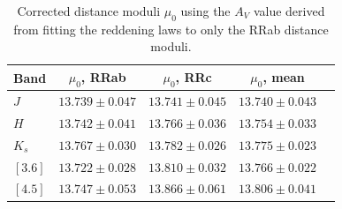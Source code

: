 \documentclass[a4paper,fleqn,usenatbib]{mnras}
\begin{document}

\endgroup

\begin{table}
\centering
\caption{Corrected distance moduli $\mu_0$ using the $A_V$ value derived from fitting the reddening laws to only the RRab distance moduli.}
\label{tab:dist_mod_ab}
\begin{tabular}{l||c|c|c|r} 
\hline \hline
Band & $\mu_0$, RRab & $\mu_0$, RRc & $\mu_0$, mean \\
\hline
$J$ & $13.739 \pm 0.047$ & $13.741 \pm 0.045$ & $13.740 \pm 0.043$ \\
$H$ & $13.742 \pm 0.041$ & $13.766 \pm 0.036$ & $13.754 \pm 0.033$ \\
$K_s$ & $13.767 \pm 0.030$ & $13.782 \pm 0.026$ & $13.775 \pm 0.023$ \\
$[3.6]$ & $13.722 \pm 0.028$ & $13.810 \pm 0.032$ & $13.766 \pm 0.022$ \\
$[4.5]$ & $13.747 \pm 0.053$ & $13.866 \pm 0.061$ & $13.806 \pm 0.041$ \\
\hline
\end{tabular}
\end{table}
\end{document}

